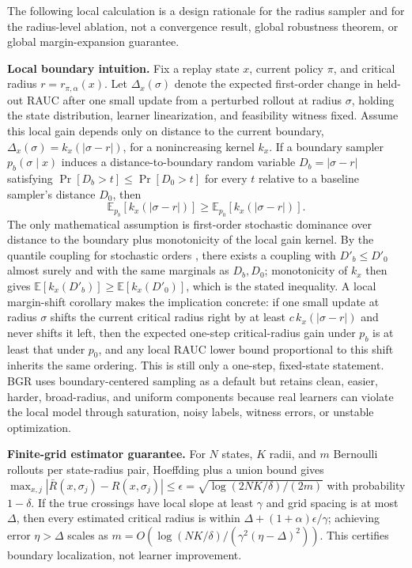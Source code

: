 \documentclass[letterpaper]{article}
\begin{document}
The following local calculation is a design rationale for the radius sampler and for the radius-level ablation, not a convergence result, global robustness theorem, or global margin-expansion guarantee.

\textbf{Local boundary intuition.} Fix a replay state $x$, current policy $\pi$, and critical radius $r=r_{\pi,\alpha}(x)$. Let $\Delta_x(\sigma)$ denote the expected first-order change in held-out RAUC after one small update from a perturbed rollout at radius $\sigma$, holding the state distribution, learner linearization, and feasibility witness fixed. Assume this local gain depends only on distance to the current boundary, $\Delta_x(\sigma)=k_x(|\sigma-r|)$, for a nonincreasing kernel $k_x$. If a boundary sampler $p_b(\sigma\mid x)$ induces a distance-to-boundary random variable $D_b=|\sigma-r|$ satisfying $\Pr[D_b>t]\le\Pr[D_0>t]$ for every $t$ relative to a baseline sampler's distance $D_0$, then
\begin{equation}
\mathbb{E}_{p_b}[k_x(|\sigma-r|)] \ge \mathbb{E}_{p_0}[k_x(|\sigma-r|)].
\end{equation}
The only mathematical assumption is first-order stochastic dominance over distance to the boundary plus monotonicity of the local gain kernel. By the quantile coupling for stochastic orders \cite{shaked2007stochastic}, there exists a coupling with $D'_b\le D'_0$ almost surely and with the same marginals as $D_b,D_0$; monotonicity of $k_x$ then gives $\mathbb{E}[k_x(D'_b)]\ge \mathbb{E}[k_x(D'_0)]$, which is the stated inequality. A local margin-shift corollary makes the implication concrete: if one small update at radius $\sigma$ shifts the current critical radius right by at least $c\,k_x(|\sigma-r|)$ and never shifts it left, then the expected one-step critical-radius gain under $p_b$ is at least that under $p_0$, and any local RAUC lower bound proportional to this shift inherits the same ordering. This is still only a one-step, fixed-state statement. BGR uses boundary-centered sampling as a default but retains clean, easier, harder, broad-radius, and uniform components because real learners can violate the local model through saturation, noisy labels, witness errors, or unstable optimization.

\textbf{Finite-grid estimator guarantee.} For $N$ states, $K$ radii, and $m$ Bernoulli rollouts per state-radius pair, Hoeffding plus a union bound gives $\max_{x,j}|\bar R(x,\sigma_j)-R(x,\sigma_j)|\le\epsilon=\sqrt{\log(2NK/\delta)/(2m)}$ with probability $1-\delta$. If the true crossings have local slope at least $\gamma$ and grid spacing is at most $\Delta$, then every estimated critical radius is within $\Delta+(1+\alpha)\epsilon/\gamma$; achieving error $\eta>\Delta$ scales as $m=O(\log(NK/\delta)/(\gamma^2(\eta-\Delta)^2))$. This certifies boundary localization, not learner improvement.
\end{document}
